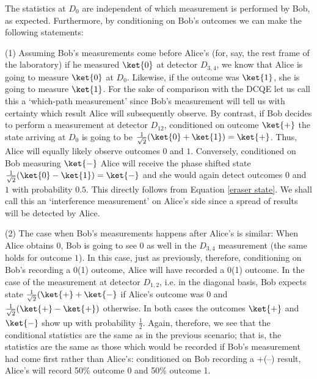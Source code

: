 \documentclass[12pt]{article}
\numberwithin{equation}{section}
\begin{document}
The statistics at $D_0$ are independent of which measurement is performed by Bob, as expected. Furthermore, by conditioning on Bob's outcomes we can make the following statements:

(1) Assuming Bob's measurements come before Alice's (for, say, the rest frame of the laboratory) if he measured $\ket{0}$ at detector $D_{3,4}$, we know that Alice is going to measure $\ket{0}$ at $D_0$. Likewise, if the outcome was $\ket{1}$, she is going to measure $\ket{1}$. For the sake of comparison with the DCQE let us call this a `which-path measurement' since Bob's measurement will tell us with certainty which result Alice will subsequently observe. By contrast, if Bob decides to perform a measurement at detector $D_{12}$, conditioned on outcome $\ket{+}$ the state arriving at $D_0$ is going to be $\frac{1}{\sqrt{2}}(\ket{0}+\ket{1})=\ket{+}$. Thus, Alice will equally likely observe outcomes $0$ and $1$.  Conversely, conditioned on Bob measuring $\ket{-}$ Alice will receive the phase shifted state $\frac{1}{\sqrt{2}}(\ket{0}-\ket{1})=\ket{-}$ and she would again detect outcomes $0$ and $1$ with probability $0.5$. This directly follows from Equation \ref{eraser state}. We shall call this an `interference measurement' on Alice's side since a spread of results will be detected by Alice. 

(2) The case when Bob's measurements happens after Alice's is similar: When Alice obtains $0$, Bob is going to see $0$ as well in the $D_{3,4}$ measurement (the same holds for outcome $1$). In this case, just as previously, therefore, conditioning on Bob's recording a 0(1) outcome, Alice will have recorded a 0(1) outcome. In the case of the measurement at detector $D_{1,2}$, i.e. in the diagonal basis, Bob expects state $\frac{1}{\sqrt{2}}(\ket{+}+\ket{-}$ if Alice's outcome was $0$ and $\frac{1}{\sqrt{2}}(\ket{+}-\ket{+})$ otherwise. In both cases the outcomes $\ket{+}$ and $\ket{-}$ show up with probability $\frac{1}{2}$. Again, therefore, we see that the conditional statistics are the same as in the previous scenario; that is, the statistics are the same as  those which would be recorded if Bob's measurement had come first rather than Alice's: conditioned on Bob recording a +(--) result, Alice's will record 50\% outcome 0 and 50\% outcome 1.
\end{document}
